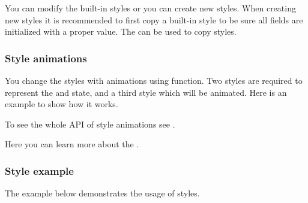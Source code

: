 \documentclass[letterpaper,10pt,english]{sphinxmanual}
\begin{document}
You can modify the built-in styles or you can create new styles. When creating new styles it is recommended to first copy a built-in style to be sure all fields are initialized with a proper value. The  can be used to copy styles.


\subsubsection{Style animations}
\label{\detokenize{overview/styles:style-animations}}
You change the styles with animations using  function. Two styles are required to represent the  and  state, and a third style which will be animated. Here is an example to show how it works.

\begin{sphinxVerbatim}[commandchars=\\\{\}]
 
                                                 
    
                             
                                               
\end{sphinxVerbatim}

To see the whole API of style animations see .

Here you can learn more about the {\hyperref[\detokenize{overview/animations::doc}]{}}.


\subsubsection{Style example}
\label{\detokenize{overview/styles:style-example}}
The example below demonstrates the usage of styles.
\end{document}
